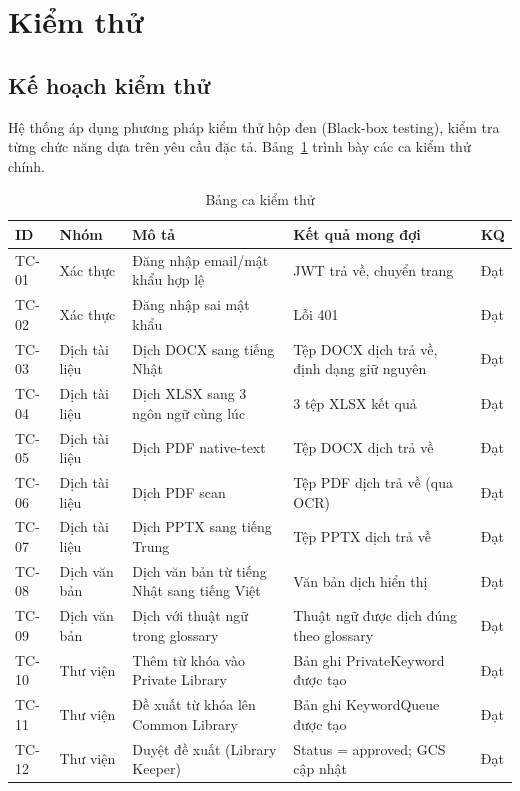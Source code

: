 \section{Kiểm thử}

\subsection{Kế hoạch kiểm thử}

Hệ thống áp dụng phương pháp kiểm thử hộp đen (Black-box testing), kiểm tra từng chức năng
dựa trên yêu cầu đặc tả. Bảng~\ref{tab:testcases} trình bày các ca kiểm thử chính.

\begin{table}[H]
\centering
\caption{Bảng ca kiểm thử}
\label{tab:testcases}
\renewcommand{\arraystretch}{1.3}
\begin{tabularx}{\textwidth}{|l|l|X|X|l|}
\hline
\textbf{ID} & \textbf{Nhóm} & \textbf{Mô tả} & \textbf{Kết quả mong đợi} & \textbf{KQ} \\
\hline
TC-01 & Xác thực & Đăng nhập email/mật khẩu hợp lệ & JWT trả về, chuyển trang & Đạt \\
\hline
TC-02 & Xác thực & Đăng nhập sai mật khẩu & Lỗi 401 & Đạt \\
\hline
TC-03 & Dịch tài liệu & Dịch DOCX sang tiếng Nhật & Tệp DOCX dịch trả về, định dạng giữ nguyên & Đạt \\
\hline
TC-04 & Dịch tài liệu & Dịch XLSX sang 3 ngôn ngữ cùng lúc & 3 tệp XLSX kết quả & Đạt \\
\hline
TC-05 & Dịch tài liệu & Dịch PDF native-text & Tệp DOCX dịch trả về & Đạt \\
\hline
TC-06 & Dịch tài liệu & Dịch PDF scan & Tệp PDF dịch trả về (qua OCR) & Đạt \\
\hline
TC-07 & Dịch tài liệu & Dịch PPTX sang tiếng Trung & Tệp PPTX dịch trả về & Đạt \\
\hline
TC-08 & Dịch văn bản & Dịch văn bản từ tiếng Nhật sang tiếng Việt & Văn bản dịch hiển thị & Đạt \\
\hline
TC-09 & Dịch văn bản & Dịch với thuật ngữ trong glossary & Thuật ngữ được dịch đúng theo glossary & Đạt \\
\hline
TC-10 & Thư viện & Thêm từ khóa vào Private Library & Bản ghi PrivateKeyword được tạo & Đạt \\
\hline
TC-11 & Thư viện & Đề xuất từ khóa lên Common Library & Bản ghi KeywordQueue được tạo & Đạt \\
\hline
TC-12 & Thư viện & Duyệt đề xuất (Library Keeper) & Status = approved; GCS cập nhật & Đạt \\

\end{tabularx}
\end{table}
